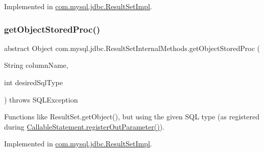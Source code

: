 Implemented in \mbox{\hyperlink{classcom_1_1mysql_1_1jdbc_1_1_result_set_impl_a30be3e2e7e3998035613e01d5674aa71}{com.\+mysql.\+jdbc.\+Result\+Set\+Impl}}.

\mbox{\label{interfacecom_1_1mysql_1_1jdbc_1_1_result_set_internal_methods_aa693d4e906617c6ef3be279b1416748b}} 
\subsubsection{\texorpdfstring{get\+Object\+Stored\+Proc()}{getObjectStoredProc()}\hspace{0.1cm}{\footnotesize\ttfamily [3/4]}}
{\footnotesize\ttfamily abstract Object com.\+mysql.\+jdbc.\+Result\+Set\+Internal\+Methods.\+get\+Object\+Stored\+Proc (\begin{DoxyParamCaption}\item[{String}]{column\+Name,  }\item[{int}]{desired\+Sql\+Type }\end{DoxyParamCaption}) throws S\+Q\+L\+Exception\hspace{0.3cm}{\ttfamily [abstract]}}

Functions like Result\+Set.\+get\+Object(), but using the given S\+QL type (as registered during \mbox{\hyperlink{classcom_1_1mysql_1_1jdbc_1_1_callable_statement_a5158af0506cf90040062b2049550f59b}{Callable\+Statement.\+register\+Out\+Parameter()}}). 

Implemented in \mbox{\hyperlink{classcom_1_1mysql_1_1jdbc_1_1_result_set_impl_a3a52fc30cfaf7a73fca13e48bbc8a5d0}{com.\+mysql.\+jdbc.\+Result\+Set\+Impl}}.

\mbox{\label{interfacecom_1_1mysql_1_1jdbc_1_1_result_set_internal_methods_ac4bc017d69d3768d7000126d47a77866}} 
